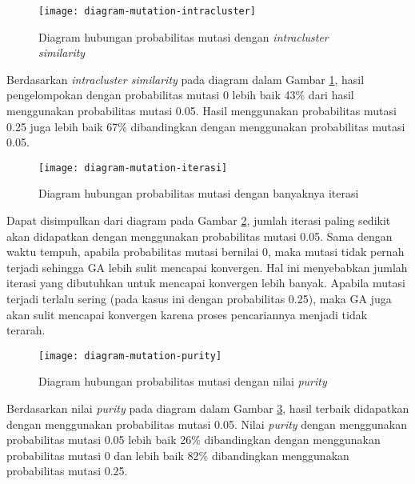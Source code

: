 \begin{enumerate}
		\begin{figure}[H]
			\centering
			\texttt{[image: diagram-mutation-intracluster]}
			\caption{Diagram hubungan probabilitas mutasi dengan \textit{intracluster similarity}}
			\label{fig:graph:mutation-intra}
		\end{figure}
		
		Berdasarkan \textit{intracluster similarity} pada diagram dalam Gambar  \ref{fig:graph:mutation-intra}, hasil pengelompokan dengan probabilitas mutasi 0 lebih baik 43\% dari hasil menggunakan probabilitas mutasi 0.05. Hasil menggunakan probabilitas mutasi 0.25 juga lebih baik 67\% dibandingkan dengan menggunakan probabilitas mutasi 0.05.
		
		\begin{figure}[H]
			\centering
			\texttt{[image: diagram-mutation-iterasi]}
			\caption{Diagram hubungan probabilitas mutasi dengan banyaknya iterasi}
			\label{fig:graph:mutation-iteration}
		\end{figure}
		
		Dapat disimpulkan dari diagram pada Gambar \ref{fig:graph:mutation-iteration}, jumlah iterasi paling sedikit akan didapatkan dengan menggunakan probabilitas mutasi 0.05. Sama dengan waktu tempuh, apabila probabilitas mutasi bernilai 0, maka mutasi tidak pernah terjadi sehingga GA lebih sulit mencapai konvergen. Hal ini menyebabkan jumlah iterasi yang dibutuhkan untuk mencapai konvergen lebih banyak. Apabila mutasi terjadi terlalu sering (pada kasus ini dengan probabilitas 0.25), maka GA juga akan sulit mencapai konvergen karena proses pencariannya menjadi tidak terarah.
		
		\begin{figure}[H]
			\centering
			\texttt{[image: diagram-mutation-purity]}
			\caption{Diagram hubungan probabilitas mutasi dengan nilai \textit{purity}}
			\label{fig:graph:mutation-purity}
		\end{figure}
		
		Berdasarkan nilai \textit{purity} pada diagram dalam Gambar \ref{fig:graph:mutation-purity}, hasil terbaik didapatkan dengan menggunakan probabilitas mutasi 0.05. Nilai \textit{purity} dengan menggunakan probabilitas mutasi 0.05 lebih baik 26\% dibandingkan dengan menggunakan probabilitas mutasi 0 dan lebih baik 82\% dibandingkan menggunakan probabilitas mutasi 0.25.
		

\end{enumerate}
